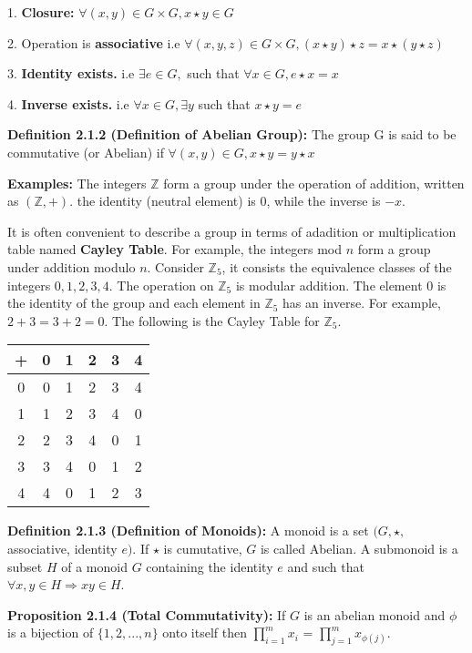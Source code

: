\documentclass[12pt,openany]{book}
\theoremstyle{definition}
\theoremstyle{definition}
\begin{document}
1. \textbf{Closure:} $\forall (x,y) \in G \times G, x \star y \in G $

2. Operation is \textbf{associative} i.e $\forall (x, y, z) \in G \times G, (x \star y) \star z = x \star (y \star z) $

3. \textbf{Identity exists.} i.e $\exists e \in G,$ such that $\forall x \in G, e \star x = x $

4. \textbf{Inverse exists.} i.e $\forall x \in G, \exists y$ such that $x \star y = e$

\noindent\textbf{Definition 2.1.2 (Definition of Abelian Group):} The group G is said to be commutative (or Abelian) if $\forall (x,y) \in G, x \star y = y \star x$

\noindent\textbf{Examples:} The integers $\mathbb{Z}$ form a group under the operation of addition, written as $(\mathbb{Z}, +)$. the identity (neutral element) is $0$, while the inverse is $-x$.

\noindent It is often convenient to describe a group in terms of adadition or multiplication table named \textbf{Cayley Table}. For example, the integers mod $n$ form a group under addition modulo $n$. Consider $\mathbb{Z}_5$, it consists the equivalence classes of the integers $0,1,2,3,4$. The operation on $\mathbb{Z}_5$ is modular addition. The element $0$ is the identity of the group and each element in $\mathbb{Z}_5$ has an inverse. For example, $2+3 = 3+2 = 0$. The following is the Cayley Table for $\mathbb{Z}_5$.

\begin{center}
\begin{tabular}{ |c|c|c|c|c|c| } 
\hline
+ & 0 & 1 & 2 & 3 & 4 \\
\hline
0 & 0 & 1 & 2 & 3 & 4 \\ 
1 & 1 & 2 & 3 & 4 & 0 \\ 
2 & 2 & 3 & 4 & 0 & 1 \\ 
3 & 3 & 4 & 0 & 1 & 2 \\ 
4 & 4 & 0 & 1 & 2 & 3 \\
\hline
\end{tabular}
\end{center}

\noindent\textbf{Definition 2.1.3 (Definition of Monoids):} A monoid is a set $(G, \star,$ associative, identity $e)$. If $\star$ is cumutative, $G$ is called Abelian. A submonoid is a subset $H$ of a monoid $G$ containing the identity $e$ and such that $\forall x, y \in H \Rightarrow xy \in H $.

\noindent\textbf{Proposition 2.1.4 (Total Commutativity):} If $G$ is an abelian monoid and $\phi$ is a bijection of $\{1,2,...,n\}$ onto itself then $\prod^{m}_{i=1}x_i$ = $\prod^{m}_{j=1}x_{\phi(j)}$.
\end{document}
